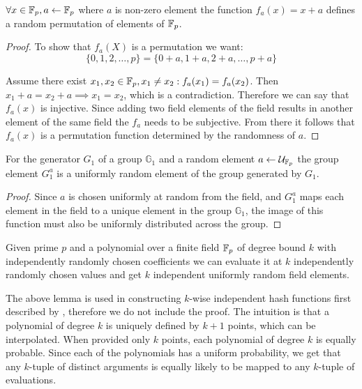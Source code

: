 \begin{lemma}
\label{lemma:addition-randomness}
    $\forall x \in \mathbb{F}_p, a \gets \mathbb{F}_p$ where $a$ is non-zero element the function $f_a(x) = x + a$ defines a random permutation of elements of $\mathbb{F}_p$.
\end{lemma}

\begin{proof}
    To show that $f_a(X)$ is a permutation we want:
    $$\{0, 1, 2, \ldots, p\} = \{0+a, 1+a, 2+a, \ldots, p+a\}$$
    
    Assume there exist $x_1, x_2 \in \mathbb{F}_p, x_1 \neq x_2: f_a(x_1) = f_a(x_2)$. Then $x_1 + a = x_2 + a \implies x_1 = x_2$, which is a contradiction. Therefore we can say that $f_a(x)$ is injective. Since adding two field elements of the field results in another element of the same field the $f_a$ needs to be subjective. From there it follows that $f_a(x)$ is a permutation function determined by the randomness of $a$.
\end{proof}


\begin{lemma}
\label{lemma:multiplication-randomness}
    For the generator $G_1$ of a group $\mathbb{G}_1$ and a random element $a \gets \mathcal{U}_{\mathbb{F}_p}$ the group element $G_1^a$ is a uniformly random element of the group generated by $G_1$.
\end{lemma}

\begin{proof}
    Since $a$ is chosen uniformly at random from the field, and $G_1^a$ maps each element in the field to a unique element in the group $\mathbb{G}_1$, the image of this function  must also be uniformly distributed across the group.
\end{proof}

\begin{lemma}
\label{lemma:kwise-eval}
    Given prime $p$ and a polynomial over a finite field $\mathbb{F}_p$ of degree bound $k$ with independently randomly chosen coefficients we can evaluate it at $k$ independently randomly chosen values and get $k$ independent uniformly random field elements.
\end{lemma}

The above lemma is used in constructing $k$-wise independent hash functions first described by \cite{WEGMAN-kwise-hash}, therefore we do not include the proof. The intuition is that a polynomial of degree $k$ is uniquely defined by $k+1$ points, which can be interpolated. When provided only $k$ points, each polynomial of degree $k$ is equally probable. Since each of the polynomials has a uniform probability, we get that any $k$-tuple of distinct arguments is equally likely to be mapped to any $k$-tuple of evaluations.

